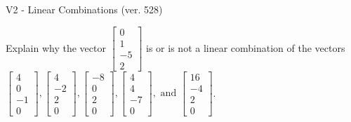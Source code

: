\begin{exercise}
  \begin{exerciseTitle}V2 - Linear Combinations (ver. 528)\end{exerciseTitle}
  \begin{exerciseStatement}
    Explain why the vector \(\left[\begin{array}{c}
0 \\
1 \\
-5 \\
2
\end{array}\right]\)  is or is not a linear 
	combination of the vectors \(\left[\begin{array}{c}
4 \\
0 \\
-1 \\
0
\end{array}\right] , \left[\begin{array}{c}
4 \\
-2 \\
2 \\
0
\end{array}\right] , \left[\begin{array}{c}
-8 \\
0 \\
2 \\
0
\end{array}\right] , \left[\begin{array}{c}
4 \\
4 \\
-7 \\
0
\end{array}\right] , \text{ and } \left[\begin{array}{c}
16 \\
-4 \\
2 \\
0
\end{array}\right]\).
	



\end{exerciseStatement}
\end{exercise}
